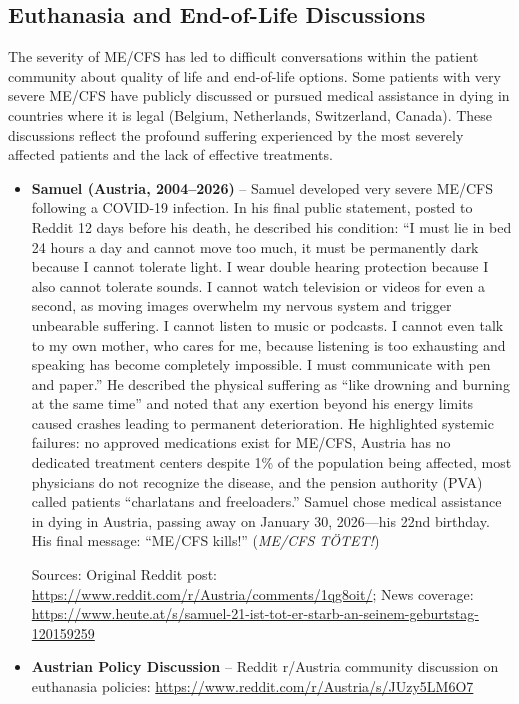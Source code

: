 \subsection{Euthanasia and End-of-Life Discussions}

\begin{remark}
The severity of ME/CFS has led to difficult conversations within the patient community about quality of life and end-of-life options. Some patients with very severe ME/CFS have publicly discussed or pursued medical assistance in dying in countries where it is legal (Belgium, Netherlands, Switzerland, Canada). These discussions reflect the profound suffering experienced by the most severely affected patients and the lack of effective treatments.
\end{remark}

\begin{itemize}
    \item \textbf{Samuel (Austria, 2004--2026)} -- Samuel developed very severe ME/CFS following a COVID-19 infection. In his final public statement, posted to Reddit 12 days before his death, he described his condition: ``I must lie in bed 24 hours a day and cannot move too much, it must be permanently dark because I cannot tolerate light. I wear double hearing protection because I also cannot tolerate sounds. I cannot watch television or videos for even a second, as moving images overwhelm my nervous system and trigger unbearable suffering. I cannot listen to music or podcasts. I cannot even talk to my own mother, who cares for me, because listening is too exhausting and speaking has become completely impossible. I must communicate with pen and paper.'' He described the physical suffering as ``like drowning and burning at the same time'' and noted that any exertion beyond his energy limits caused crashes leading to permanent deterioration. He highlighted systemic failures: no approved medications exist for ME/CFS, Austria has no dedicated treatment centers despite 1\% of the population being affected, most physicians do not recognize the disease, and the pension authority (PVA) called patients ``charlatans and freeloaders.'' Samuel chose medical assistance in dying in Austria, passing away on January 30, 2026---his 22nd birthday. His final message: ``ME/CFS kills!'' (\textit{ME/CFS TÖTET!})

    Sources: Original Reddit post: \url{https://www.reddit.com/r/Austria/comments/1qg8oit/}; News coverage: \url{https://www.heute.at/s/samuel-21-ist-tot-er-starb-an-seinem-geburtstag-120159259}

    \item \textbf{Austrian Policy Discussion} -- Reddit r/Austria community discussion on euthanasia policies: \url{https://www.reddit.com/r/Austria/s/JUzy5LM6O7}
\end{itemize}

